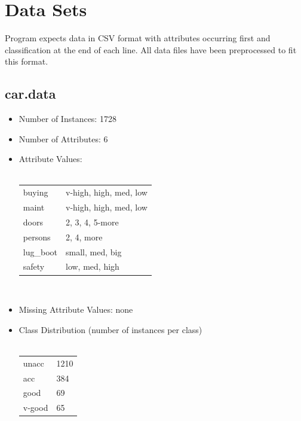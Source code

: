 \documentclass[10pt]{report}
\begin{document}
\section{Data Sets}
Program expects data in CSV format with attributes occurring first and
classification at the end of each line. All data files have been
preprocessed to fit this format.


\subsection*{car.data}
\begin{itemize}
\item Number of Instances: 1728
\item Number of Attributes: 6
\item Attribute Values:
  \\\\
  \begin{left}
    \begin{tabular}{ l l }
      buying     & v-high, high, med, low \\
      maint      & v-high, high, med, low \\
      doors      & 2, 3, 4, 5-more \\
      persons    & 2, 4, more \\
      lug\_boot  & small, med, big \\
      safety     & low, med, high \\
    \end{tabular}
  \end{left}
  \\
\item Missing Attribute Values: none
\item Class Distribution (number of instances per class)
  \\\\
  \begin{left}
    \begin{tabular}{ l l }
      unacc   &  1210 \\
      acc     &   384 \\   
      good    &    69 \\     
      v-good  &    65 \\
    \end{tabular}
  \end{left}
\end{itemize}
\end{document}
